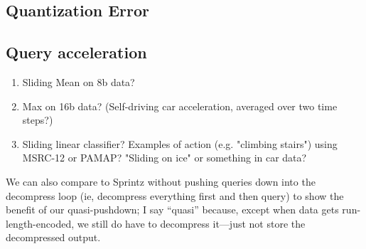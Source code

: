 



\subsection{Quantization Error}


\subsection{Query acceleration}

\begin{enumerate}
\item Sliding Mean on 8b data?
\item Max on 16b data? (Self-driving car acceleration, averaged over two time steps?)
\item Sliding linear classifier? Examples of action (e.g. "climbing stairs") using MSRC-12 or PAMAP? "Sliding on ice" or something in car data?
\end{enumerate}

We can also compare to Sprintz without pushing queries down into the decompress loop (ie, decompress everything first and then query) to show the benefit of our quasi-pushdown; I say ``quasi'' because, except when data gets run-length-encoded, we still do have to decompress it---just not store the decompressed output.

